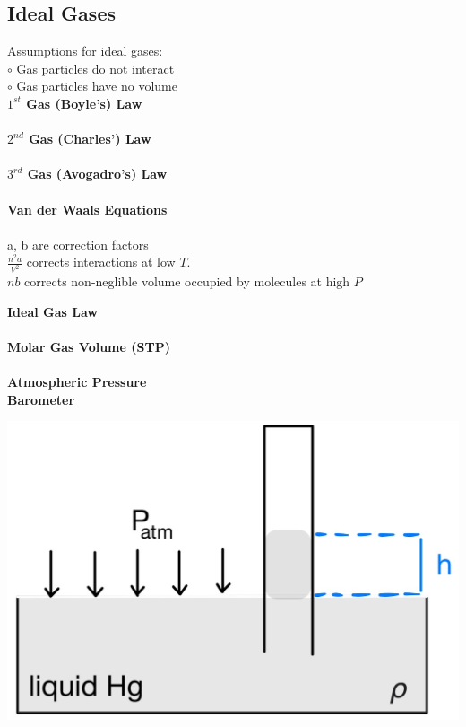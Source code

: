\subsection{Ideal Gases}
\begin{minipage}{0.33\linewidth}
    Assumptions for ideal gases:\\
    $\circ$ Gas particles do not interact\\
    $\circ$ Gas particles have no volume\\
    \textbf{$1^{st}$ Gas (Boyle's) Law}\\
    \\
    \textbf{$2^{nd}$ Gas (Charles') Law}\\
    \\
    \textbf{$3^{rd}$ Gas (Avogadro's) Law}\\
    \\
    \textbf{Van der Waals Equations}\\
    \\
    a, b are correction factors\\
    $\frac{n^2a}{V^2}$ corrects interactions at low $T$.\\
    $nb$ corrects non-neglible volume occupied by molecules at high $P$
\end{minipage}
\begin{minipage}{0.33\linewidth}
    \textbf{Ideal Gas Law}\\
    \\
    \textbf{Molar Gas Volume (STP)}\\
    \\
    \textbf{Atmospheric Pressure}\\
    \textbf{Barometer}\\
    \begin{center}
        \includegraphics[width = 0.9\linewidth]{images/Barometer.jpeg}
    \end{center}
\end{minipage}
